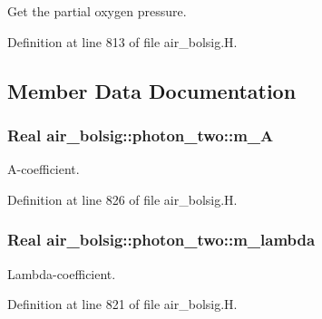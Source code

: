 Get the partial oxygen pressure. 



Definition at line 813 of file air\+\_\+bolsig.\+H.



\subsection{Member Data Documentation}
\subsubsection[{\texorpdfstring{m\+\_\+A}{m_A}}]{\setlength{\rightskip}{0pt plus 5cm}Real air\+\_\+bolsig\+::photon\+\_\+two\+::m\+\_\+A\hspace{0.3cm}{\ttfamily [protected]}}\hypertarget{classair__bolsig_1_1photon__two_a6b78181a865cc6fcdacfddebe12742c4}{}\label{classair__bolsig_1_1photon__two_a6b78181a865cc6fcdacfddebe12742c4}


A-\/coefficient. 



Definition at line 826 of file air\+\_\+bolsig.\+H.

\subsubsection[{\texorpdfstring{m\+\_\+lambda}{m_lambda}}]{\setlength{\rightskip}{0pt plus 5cm}Real air\+\_\+bolsig\+::photon\+\_\+two\+::m\+\_\+lambda\hspace{0.3cm}{\ttfamily [protected]}}\hypertarget{classair__bolsig_1_1photon__two_af9f2fa15dcbd74d7ac99faf909b9b97b}{}\label{classair__bolsig_1_1photon__two_af9f2fa15dcbd74d7ac99faf909b9b97b}


Lambda-\/coefficient. 



Definition at line 821 of file air\+\_\+bolsig.\+H.

